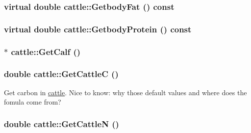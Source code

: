 \label{classcattle_a8b0fca6e07ddb7aadda529b88c1f1f8d}
\hypertarget{classcattle_a0ef7cd4d80ad3abf2d95f792d7d84ea4}{
\subsubsection[{GetbodyFat}]{\setlength{\rightskip}{0pt plus 5cm}virtual double cattle::GetbodyFat () const}}
\label{classcattle_a0ef7cd4d80ad3abf2d95f792d7d84ea4}
\hypertarget{classcattle_ae19ec8afe91d65ef9b60eecc36acbffd}{
\subsubsection[{GetbodyProtein}]{\setlength{\rightskip}{0pt plus 5cm}virtual double cattle::GetbodyProtein () const}}
\label{classcattle_ae19ec8afe91d65ef9b60eecc36acbffd}
\hypertarget{classcattle_a0db754787fa065708f8d1d54afa51883}{
\subsubsection[{GetCalf}]{$\ast$ cattle::GetCalf ()}}
\label{classcattle_a0db754787fa065708f8d1d54afa51883}
\hypertarget{classcattle_a68445d9f0e164038d9046facfe259610}{
\subsubsection[{GetCattleC}]{\setlength{\rightskip}{0pt plus 5cm}double cattle::GetCattleC ()}}
\label{classcattle_a68445d9f0e164038d9046facfe259610}
Get carbon in \hyperlink{classcattle}{cattle}. Nice to know: why those default values and where does the fomula come from? \hypertarget{classcattle_a119738767d9cf6ef205a9e097f5f0fd6}{
\subsubsection[{GetCattleN}]{\setlength{\rightskip}{0pt plus 5cm}double cattle::GetCattleN ()}}
